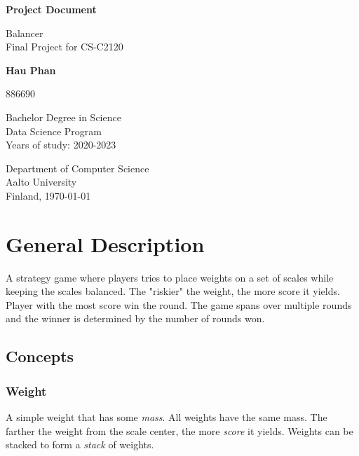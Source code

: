 \documentclass[12pt]{article}
\begin{document}
\begin{titlepage}
    \thispagestyle{fancy}
    \begin{center}
        \vspace*{1cm}
            
        \huge
        \textbf{Project Document}
            
        \vspace{0.5cm}
        \Large
        Balancer\\

        \normalsize
        \vspace{0.5cm}
        Final Project for CS-C2120
            
        \vspace{1.5cm}
            
        \textbf{Hau Phan}

        \normalsize
        886690
            
        \vfill

            
        Bachelor Degree in Science\\
        Data Science Program\\
        Years of study: 2020-2023
            
        \vspace{0.8cm}
            
        \normalsize
        Department of Computer Science\\
        Aalto University\\
        Finland, \today
    \end{center}
\end{titlepage}
\newpage

\tableofcontents
{}
\newpage

\section{General Description}
A strategy game where players tries to place weights on a set of scales while
keeping the scales balanced. The "riskier" the weight, the more score it yields.
Player with the most score win the round. The game spans over multiple rounds
and the winner is determined by the number of rounds won.
\subsection{Concepts}
\subsubsection{Weight}
A simple weight that has some \textit{mass}. All weights have the same mass. The
farther the weight from the scale center, the more \textit{score} it yields.
Weights can be stacked to form a \textit{stack} of weights.
\end{document}
